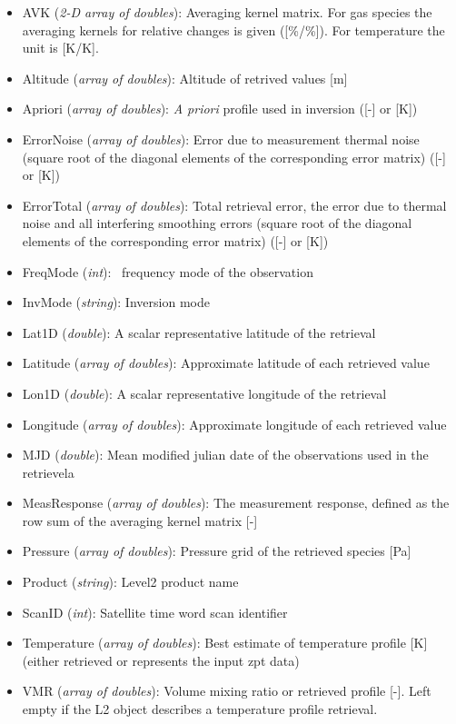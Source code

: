 \begin{itemize}
    \item AVK (\emph{2-D array of doubles}): Averaging kernel matrix. For
      gas species the averaging kernels for relative changes is given
      ([\%/\%]). For temperature the unit is [K/K]. 
    \item Altitude (\emph{array of doubles}): Altitude of retrived values [m]
    \item Apriori (\emph{array of doubles}): \textit{A priori} profile used in
      inversion ([-] or [K])
    \item ErrorNoise (\emph{array of doubles}): Error due to measurement
      thermal noise (square root of the diagonal elements of the corresponding
      error matrix) ([-] or [K])
    \item ErrorTotal (\emph{array of doubles}): Total retrieval error, the
      error due to thermal noise and all interfering smoothing errors (square
      root of the diagonal elements of the corresponding error matrix) ([-]
      or [K])
    \item FreqMode (\emph{int}): \smr\ frequency mode of the observation
    \item InvMode (\emph{string}): Inversion mode 
    \item Lat1D (\emph{double}): A scalar representative latitude of the retrieval
    \item Latitude  (\emph{array of doubles}): Approximate latitude of each
      retrieved value
    \item Lon1D (\emph{double}): A scalar representative longitude of the retrieval
    \item Longitude  (\emph{array of doubles}): Approximate longitude of each
      retrieved value
    \item MJD (\emph{double}): Mean modified julian date of the observations
      used in the retrievela
    \item MeasResponse (\emph{array of doubles}): The measurement response, defined 
      as the row sum of the averaging kernel matrix [-]
    \item Pressure (\emph{array of doubles}): Pressure grid of the retrieved species [Pa] 
    \item Product (\emph{string}): Level2 product name
    \item ScanID (\emph{int}): Satellite time word scan identifier
    \item Temperature (\emph{array of doubles}): Best estimate of temperature
      profile [K] (either retrieved or represents the input zpt data) 
    \item VMR (\emph{array of doubles}): Volume mixing ratio or retrieved
      profile [-]. Left empty if the L2 object describes a temperature profile
      retrieval.

\end{itemize}

